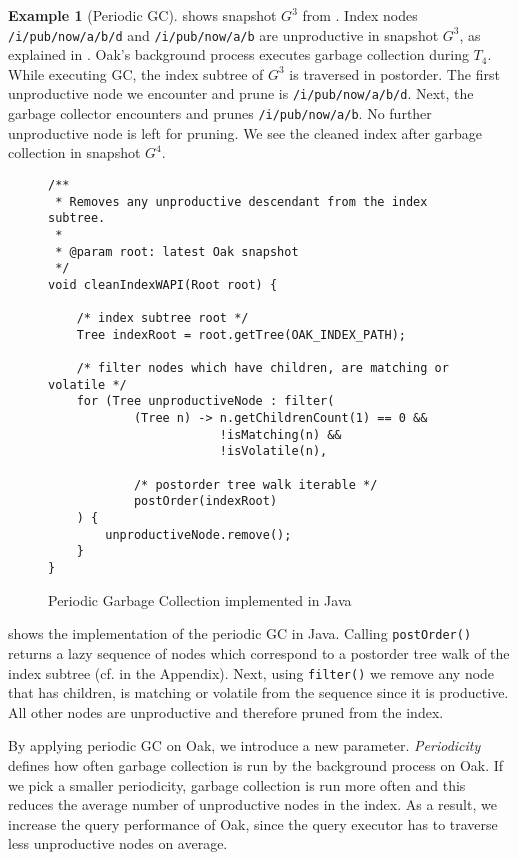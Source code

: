 \documentclass[abstracton,12pt]{scrartcl}
\theoremstyle{definition}
\newtheorem{example}{Example}
\begin{document}
\begin{example}[Periodic GC]
   shows snapshot $G^3$ from
  . Index nodes \texttt{/i/pub/now/a/b/d}
  and \texttt{/i/pub/now/a/b} are unproductive in snapshot $G^3$, as explained
  in . Oak's background process executes garbage
  collection during $T_4$. While executing GC, the index subtree of $G^3$ is
  traversed in postorder.
  The first unproductive node we encounter and prune is
  \texttt{/i/pub/now/a/b/d}. Next, the garbage collector encounters and prunes
  \texttt{/i/pub/now/a/b}. No further unproductive node is left for pruning. We
  see the cleaned index after garbage collection in snapshot $G^4$.
\end{example}

\begin{figure}[H]
  \small
  \begin{framed}
\begin{verbatim}
/**
 * Removes any unproductive descendant from the index subtree.
 *
 * @param root: latest Oak snapshot 
 */
void cleanIndexWAPI(Root root) {

    /* index subtree root */
    Tree indexRoot = root.getTree(OAK_INDEX_PATH);

    /* filter nodes which have children, are matching or volatile */
    for (Tree unproductiveNode : filter(
            (Tree n) -> n.getChildrenCount(1) == 0 &&
                        !isMatching(n) &&
                        !isVolatile(n),

            /* postorder tree walk iterable */
            postOrder(indexRoot)
    ) {
        unproductiveNode.remove();
    }
}
\end{verbatim}
  \end{framed}
  \caption[Periodic GC implemented in Java]{Periodic Garbage Collection
    implemented in Java}
  \label{fig:java_periodic_gc}
\end{figure}

 shows the implementation of the periodic
GC in Java. Calling \texttt{postOrder()} returns a lazy sequence of nodes
which correspond to a postorder tree walk of the index subtree (cf.
 in the Appendix). Next, using \texttt{filter()} we
remove any node
that has children, is matching or volatile from the sequence since it is
productive. All other nodes are
unproductive and therefore pruned from the index.

By applying periodic GC on Oak, we introduce a new
parameter. \textit{Periodicity} defines how often garbage collection is run by
the background process on Oak. If we pick a smaller
periodicity, garbage collection is run more often and this
reduces the average number of unproductive nodes in the index. As a result, we
increase the query performance of Oak,
since the query executor has to traverse less unproductive nodes on average.
\end{document}
